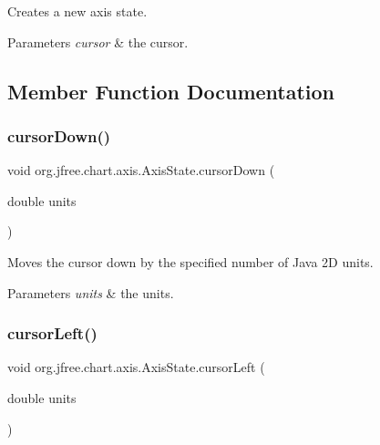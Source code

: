 Creates a new axis state.


\begin{DoxyParams}{Parameters}
{\em cursor} & the cursor. \\
\hline
\end{DoxyParams}


\subsection{Member Function Documentation}
\mbox{\label{classorg_1_1jfree_1_1chart_1_1axis_1_1_axis_state_a14de2e0448bc1203b659d151ba70d5bc}} 
\subsubsection{\texorpdfstring{cursor\+Down()}{cursorDown()}}
{\footnotesize\ttfamily void org.\+jfree.\+chart.\+axis.\+Axis\+State.\+cursor\+Down (\begin{DoxyParamCaption}\item[{double}]{units }\end{DoxyParamCaption})}

Moves the cursor down by the specified number of Java 2D units.


\begin{DoxyParams}{Parameters}
{\em units} & the units. \\
\hline
\end{DoxyParams}
\mbox{\label{classorg_1_1jfree_1_1chart_1_1axis_1_1_axis_state_a0a9bc509537e54f098fc68837e0321d2}} 
\subsubsection{\texorpdfstring{cursor\+Left()}{cursorLeft()}}
{\footnotesize\ttfamily void org.\+jfree.\+chart.\+axis.\+Axis\+State.\+cursor\+Left (\begin{DoxyParamCaption}\item[{double}]{units }\end{DoxyParamCaption})}

